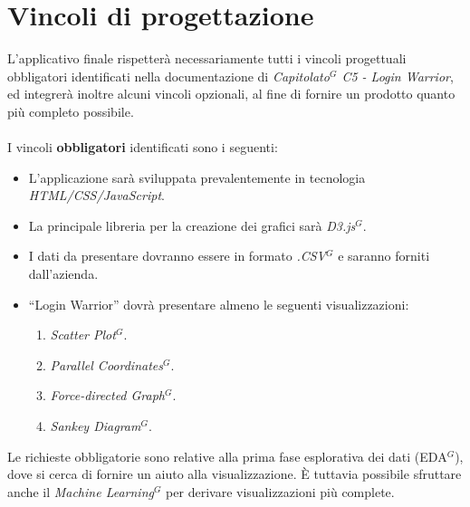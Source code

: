 \section{Vincoli di progettazione}

L'applicativo finale rispetterà necessariamente tutti i vincoli progettuali obbligatori identificati nella documentazione di \textit{Capitolato$^{G}$ C5 - Login Warrior}, ed integrerà inoltre alcuni vincoli opzionali, al fine di fornire un prodotto quanto più completo possibile. \\ \\
I vincoli \textbf{obbligatori} identificati sono i seguenti:
\begin{itemize}
	\item L’applicazione sarà sviluppata prevalentemente in tecnologia \textit{HTML/CSS/JavaScript}.
	\item La principale libreria per la creazione dei grafici sarà \textit{D3.js$^{G}$}.
	\item I dati da presentare dovranno essere in formato \textit{.CSV$^{G}$} e saranno forniti 
			dall'azienda.
	\item “Login Warrior” dovrà presentare almeno le seguenti visualizzazioni:
		 \begin{enumerate}
                    \item \textit{Scatter Plot$^{G}$}.
                    \item \textit{Parallel Coordinates$^{G}$}.
                    \item \textit{Force-directed Graph$^{G}$}.
                    \item \textit{Sankey Diagram$^{G}$}.
		\end{enumerate}
\end{itemize}

\noindent
Le richieste obbligatorie sono relative alla prima fase esplorativa dei dati (EDA$^{G}$), dove si cerca di fornire un aiuto alla visualizzazione. È tuttavia possibile sfruttare anche il \textit{Machine Learning$^{G}$} per derivare visualizzazioni più complete.

